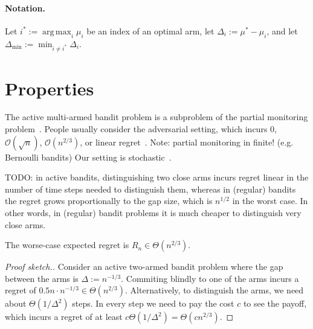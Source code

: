 \documentclass[a4paper]{article}
\DeclareMathOperator*{\argmax}{arg\,max} %
\begin{document}
\paragraph{Notation.}
Let $i^* := \argmax_i \mu_i$ be an index of an optimal arm,
let $\Delta_i := \mu^* - \mu_i$, and
let $\Delta_{\min} := \min_{i \neq i^*} \Delta_i$.



\section{Properties}

The active multi-armed bandit problem is
a subproblem of the partial monitoring problem~\citep{Piccolboni01}.
People usually consider the adversarial setting,
which incurs $0$, $\mathcal{O}(\sqrt{n})$, $\mathcal{O}(n^{2/3})$, or linear regret~\citep{Antos13}.
Note: partial monitoring in finite! (e.g. Bernoulli bandits)
Our setting is stochastic~\citep{Komiyama15}.

TODO: in active bandits, distinguishing two close arms incurs regret linear in the number of time steps needed to distinguish them, whereas in (regular) bandits the regret grows proportionally to the gap size, which is $n^{1/2}$ in the worst case.
In other words, in (regular) bandit problems it is much cheaper
to distinguish very close arms.

\begin{proposition}
The worse-case expected regret is $R_n \in \Theta(n^{2/3})$.
\end{proposition}
\begin{proof}[Proof sketch.]
Consider an active two-armed bandit problem
where the gap between the arms is $\Delta := n^{-1/3}$.
Commiting blindly to one of the arms incurs a regret of
$0.5n \cdot n^{-1/3} \in \Theta(n^{2/3})$.
Alternatively, to distinguish the arms,
we need about $\Theta(1/\Delta^2)$ steps.
In every step we need to pay the cost $c$ to see the payoff,
which incurs a regret of
at least $c\Theta(1/\Delta^2) = \Theta(cn^{2/3})$.
\end{proof}
\end{document}
